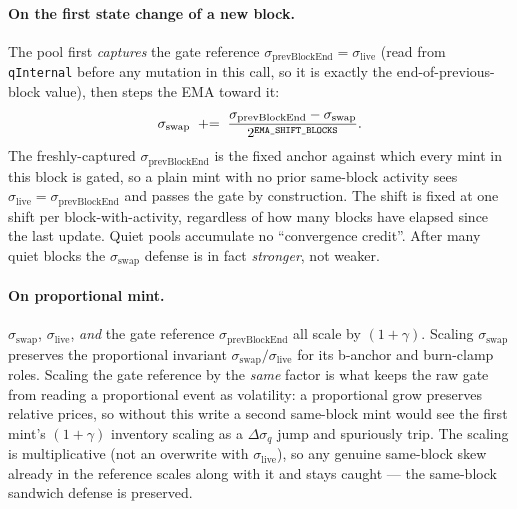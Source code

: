 \documentclass[11pt]{article}
\begin{document}
\paragraph{On the first state change of a new block.}
The pool first \emph{captures} the gate reference
$\sigma_{\mathrm{prevBlockEnd}} = \sigma_{\mathrm{live}}$ (read from
\texttt{qInternal} before any mutation in this call, so it is exactly
the end-of-previous-block value), then steps the EMA toward it:
\[
  \sigma_{\mathrm{swap}} \;\mathrel{+}=\;
  \frac{\sigma_{\mathrm{prevBlockEnd}} - \sigma_{\mathrm{swap}}}
       {2^{\text{\texttt{EMA\_SHIFT\_BLOCKS}}}}.
\]
The freshly-captured $\sigma_{\mathrm{prevBlockEnd}}$ is the fixed
anchor against which every mint in this block is gated, so a plain mint
with no prior same-block activity sees $\sigma_{\mathrm{live}} =
\sigma_{\mathrm{prevBlockEnd}}$ and passes the gate by construction.
The shift is fixed at one shift per block-with-activity, regardless of
how many blocks have elapsed since the last update. Quiet pools
accumulate no ``convergence credit''. After many quiet blocks the
$\sigma_{\mathrm{swap}}$ defense is in fact \emph{stronger}, not
weaker.

\paragraph{On proportional mint.}
$\sigma_{\mathrm{swap}}$, $\sigma_{\mathrm{live}}$, \emph{and} the gate
reference $\sigma_{\mathrm{prevBlockEnd}}$ all scale by $(1 + \gamma)$.
Scaling $\sigma_{\mathrm{swap}}$ preserves the proportional invariant
$\sigma_{\mathrm{swap}} / \sigma_{\mathrm{live}}$ for its b-anchor and
burn-clamp roles. Scaling the gate reference by the \emph{same} factor
is what keeps the raw gate from reading a proportional event as
volatility: a proportional grow preserves relative prices, so without
this write a second same-block mint would see the first mint's
$(1+\gamma)$ inventory scaling as a $\Delta\sigma_q$ jump and spuriously
trip. The scaling is multiplicative (not an overwrite with
$\sigma_{\mathrm{live}}$), so any genuine same-block skew already in the
reference scales along with it and stays caught --- the same-block
sandwich defense is preserved.
\end{document}
